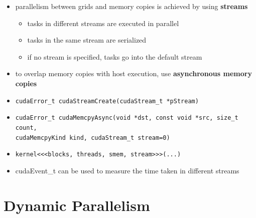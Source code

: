 \documentclass{article}
\begin{document}
\begin{itemize}
\item parallelism between grids and memory copies is achieved by using \textbf{streams}
\begin{itemize}
\item tasks in different streams are executed in parallel
\item tasks in the same stream are serialized
\item if no stream is specified, tasks go into the default stream
\end{itemize}
\item to overlap memory copies with host execution, use \textbf{asynchronous memory copies}
\item \texttt{cudaError\_t cudaStreamCreate(cudaStream\_t *pStream)}
\item \texttt{cudaError\_t cudaMemcpyAsync(void *dst, const void *src, size\_t count,}\\
\hspace*{14.5em} \texttt{cudaMemcpyKind kind, cudaStream\_t stream=0)}
\item \texttt{kernel<<<blocks, threads, smem, stream>>>(...)}
\item cudaEvent\_t can be used to measure the time taken in different streams


\end{itemize}

\section{Dynamic Parallelism}
\end{document}
